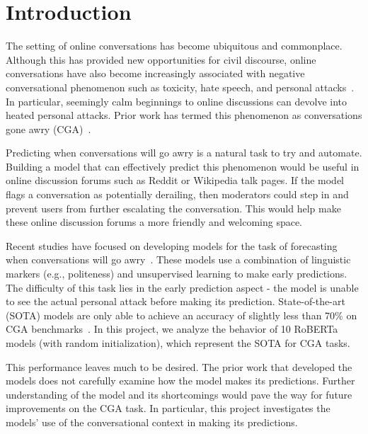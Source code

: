 \section{Introduction}
The setting of online conversations has become ubiquitous and commonplace. 
Although this has provided new opportunities for civil discourse, online conversations have also become increasingly associated with negative conversational phenomenon such as toxicity, hate speech, and personal attacks~\citep{Cheng_Danescu-Niculescu-Mizil_Leskovec_2021}.
In particular, seemingly calm beginnings to online discussions can devolve into heated personal attacks. 
Prior work has termed this phenomenon as conversations gone awry (CGA)~\citep{zhang-etal-2018-conversations, chang-danescu-niculescu-mizil-2019-trouble}.

Predicting when conversations will go awry is a natural task to try and automate. 
Building a model that can effectively predict this phenomenon would be useful in online discussion forums such as Reddit or Wikipedia talk pages. 
If the model flags a conversation as potentially derailing, then moderators could step in and prevent users from further escalating the conversation. 
This would help make these online discussion forums a more friendly and welcoming space. 

Recent studies have focused on developing models for the task of forecasting when conversations will go awry~\citep{zhang-etal-2018-conversations, chang-danescu-niculescu-mizil-2019-trouble, Yuan_Singh_2023}. 
These models use a combination of linguistic markers (e.g., politeness) and unsupervised learning to make early predictions. 
The difficulty of this task lies in the early prediction aspect - the model is unable to see the actual personal attack before making its prediction. 
State-of-the-art (SOTA) models are only able to achieve an accuracy of slightly less than 70\% on CGA benchmarks~\citep{zhang-etal-2018-conversations, chang-danescu-niculescu-mizil-2019-trouble, Yuan_Singh_2023}. In this project, we analyze the behavior of 10 RoBERTa models (with random initialization), which represent the SOTA for CGA tasks.

This performance leaves much to be desired. 
The prior work that developed the models does not carefully examine how the model makes its predictions. 
Further understanding of the model and its shortcomings would pave the way for future improvements on the CGA task. 
In particular, this project investigates the models' use of the conversational context in making its predictions. 

